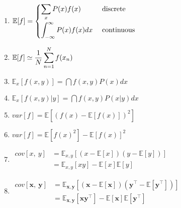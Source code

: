 \begin{multicols}{2}
\begin{enumerate}[series=rvrules]
    \item
    $
        \mathbb{E}[f] =
        \begin{cases}
            \displaystyle\sum_x P(x)f(x) & \text{ discrete} \\[0.4cm]
            \displaystyle\int_{-\infty}^\infty P(x)f(x)dx & \text{ continuous} \\
        \end{cases}
    $
    \hfill \cite{ml/book/Pattern-Recognition-And-Machine-Learning/Christopher-M-Bishop}

    \item
    $
        \mathbb{E}[f] \simeq
        \dfrac{1}{N} \displaystyle\sum_{n=1}^N f(x_n)
    $
    \hfill \cite{ml/book/Pattern-Recognition-And-Machine-Learning/Christopher-M-Bishop}

    \item
    $
        \mathbb{E}_x[f(x, y)]
        = \dint f(x,y) P(x) dx
    $
    \hfill \cite{ml/book/Pattern-Recognition-And-Machine-Learning/Christopher-M-Bishop}

    \item
    $
        \mathbb{E}_x[f(x, y)|y]
        = \dint f(x,y) P(x|y) dx
    $
    \hfill \cite{ml/book/Pattern-Recognition-And-Machine-Learning/Christopher-M-Bishop}

    \item
    $
        var[f] = \mathbb{E}[(f(x) - \mathbb{E}[f(x)])^2]
    $
    \hfill \cite{ml/book/Pattern-Recognition-And-Machine-Learning/Christopher-M-Bishop}

    \item
    $
        var[f] = \mathbb{E}[f(x)^2] - \mathbb{E}[f(x)]^2
    $
    \hfill \cite{ml/book/Pattern-Recognition-And-Machine-Learning/Christopher-M-Bishop}

    \item
    $
        \begin{aligned}
            cov[x,\ y]
                & = \mathbb{E}_{x,y} [(x - \mathbb{E}[x]) (y - \mathbb{E}[y])] \\
                & = \mathbb{E}_{x,y} [xy] - \mathbb{E}[x]\mathbb{E}[y]
        \end{aligned}
    $
    \hfill \cite{ml/book/Pattern-Recognition-And-Machine-Learning/Christopher-M-Bishop}

    \item
    $
        \begin{aligned}
            cov[\bm{x},\ \bm{y}]
                & = \mathbb{E}_{\bm{x},\bm{y}} [(\bm{x} - \mathbb{E}[\bm{x}]) (\bm{y}^\top - \mathbb{E}[\bm{y}^\top])] \\
                & = \mathbb{E}_{\bm{x},\bm{y}} [\bm{xy}^\top] - \mathbb{E}[\bm{x}]\mathbb{E}[\bm{y}^\top]
        \end{aligned}
    $
    \hfill \cite{ml/book/Pattern-Recognition-And-Machine-Learning/Christopher-M-Bishop}


\end{enumerate}
\end{multicols}
